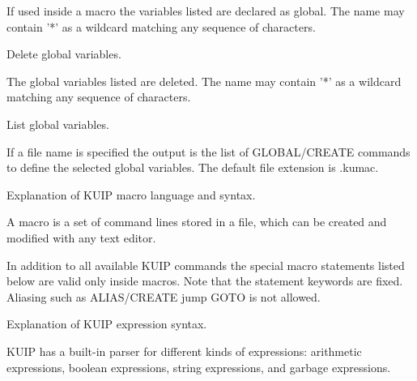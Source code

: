    \par
If used inside a macro the variables listed are declared as global.  The 
   name may contain '*' as a wildcard matching any sequence of characters.  

\ENDCMD


\BEGARG
{}
\ENDARG

   \par
Delete global variables.  

   \par
The global variables listed are deleted.  The name may contain '*' as a 
   wildcard matching any sequence of characters.  

\ENDCMD


\BEGARG
{}
\ENDARG

   \par
List global variables.  

   \par
If a file name is specified the output is the list of GLOBAL/CREATE 
   commands to define the selected global variables.  The default file 
   extension is .kumac.  

\ENDCMD
{}
\ifMENUtext
   \par
Explanation of KUIP macro language and syntax.  

   \par
A macro is a set of command lines stored in a file, which can be created 
   and modified with any text editor.  

   \par
In addition to all available KUIP commands the  special \DQUOTE{}macro 
   statements\DQUOTE{} listed below are valid only inside macros. Note that 
   the statement keywords are fixed. Aliasing such as \DQUOTE{}ALIAS/CREATE 
   jump GOTO\DQUOTE{} is not allowed.  


\fi
{}
\ifMENUtext
   \par
Explanation of KUIP expression syntax.  

   \par
KUIP has a built-in parser for different kinds of expressions: arithmetic 
   expressions, boolean expressions, string expressions, and \DQUOTE{}garbage 
   expressions\DQUOTE{}.  


